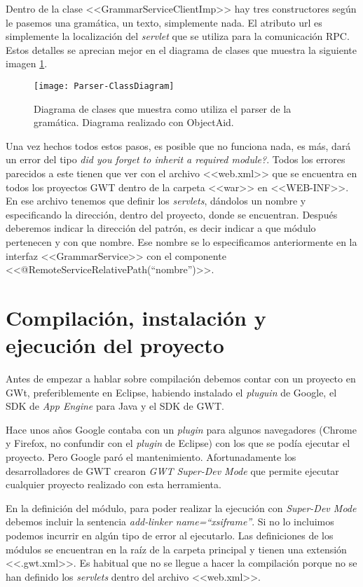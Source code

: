 Dentro de la clase <<GrammarServiceClientImp>> hay tres constructores según le pasemos una gramática, un texto, simplemente nada. El atributo url es simplemente la localización del \emph{servlet} que se utiliza para la comunicación RPC. Estos detalles se aprecian mejor en el diagrama de clases que muestra la siguiente imagen \ref{fig:5.3}.

\begin{figure}
\centering
\texttt{[image: Parser-ClassDiagram]}
\caption{Diagrama de clases que muestra como utiliza el parser de la gramática. Diagrama realizado con ObjectAid.}
\label{fig:5.3}
\end{figure}

Una vez hechos todos estos pasos, es posible que no funciona nada, es más, dará un error del tipo \textit{\emph{did you forget to inherit a required module?}}. Todos los errores parecidos a este tienen que ver con el archivo <<web.xml>> que se encuentra en todos los proyectos GWT dentro de la carpeta <<war>> en <<WEB-INF>>. En ese archivo tenemos que definir los \emph{servlets}, dándolos un nombre y especificando la dirección, dentro del proyecto, donde se encuentran. Después deberemos indicar la dirección del patrón, es decir indicar a que módulo pertenecen y con que nombre. Ese nombre se lo especificamos anteriormente en la interfaz <<GrammarService>> con el componente <<@RemoteServiceRelativePath(``nombre'')>>.

\section{Compilación, instalación y ejecución del proyecto}

Antes de empezar a hablar sobre compilación debemos contar con un proyecto en GWt, preferiblemente en Eclipse, habiendo instalado el \emph{pluguin} de Google, el SDK de \emph{App Engine} para Java y el SDK de GWT.

Hace unos años Google contaba con un \emph{plugin} para algunos navegadores (Chrome y Firefox, no confundir con el \emph{plugin} de Eclipse) con los que se podía ejecutar el proyecto. Pero Google paró el mantenimiento. Afortunadamente los desarrolladores de GWT crearon \emph{GWT Super-Dev Mode} que permite ejecutar cualquier proyecto realizado con esta herramienta.

En la definición del módulo, para poder realizar la ejecución con \emph{Super-Dev Mode} debemos incluir la sentencia \textit{add-linker name=``xsiframe''}. Si no lo incluimos podemos incurrir en algún tipo de error al ejecutarlo.
Las definiciones de los módulos se encuentran en la raíz de la carpeta principal y tienen una extensión <<.gwt.xml>>. Es habitual que no se llegue a hacer la compilación porque no se han definido los \emph{servlets} dentro del archivo <<web.xml>>.
  
